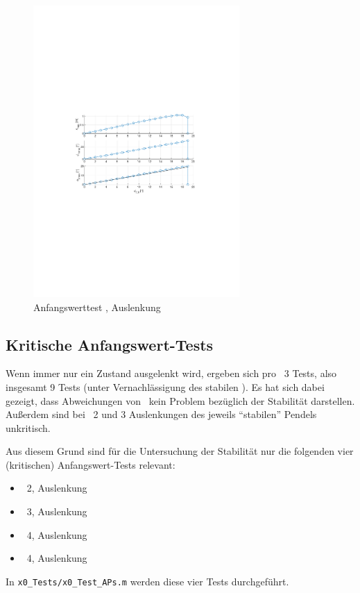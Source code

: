 \begin{figure}[htbp]
	\centering
		\includegraphics[width=0.7\textwidth]{Bilder/x0test/appr-x0-ap42.pdf}
	\caption{Anfangswerttest \apv, Auslenkung \phz}
	\label{fig:x0test}
\end{figure}


\subsection{Kritische Anfangswert-Tests}

Wenn immer nur ein Zustand ausgelenkt wird, ergeben sich pro \ap\ 3 Tests, also insgesamt 9 Tests (unter Vernachlässigung des stabilen \ape).
Es hat sich dabei gezeigt, dass Abweichungen von \xo\ kein Problem bezüglich der Stabilität darstellen.
Außerdem sind bei \ap\ 2 und 3 Auslenkungen des jeweils "`stabilen"' Pendels unkritisch.

Aus diesem Grund sind für die Untersuchung der Stabilität nur die folgenden vier (kritischen) Anfangswert-Tests relevant:
\begin{itemize}
	\item \ap\ 2, Auslenkung \phz
	\item \ap\ 3, Auslenkung \phe
	\item \ap\ 4, Auslenkung \phe
	\item \ap\ 4, Auslenkung \phz
\end{itemize}
In \texttt{x0\_Tests/x0\_Test\_APs.m} werden diese vier Tests durchgeführt.



